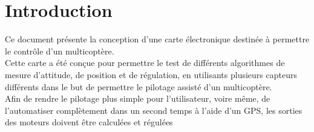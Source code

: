 
\chapter{Introduction} %

\label{Chapitre 1} %


Ce document présente la conception d'une carte électronique destinée à permettre le contrôle d'un multicoptère.
\\
Cette carte a été conçue pour permettre le test de différents algorithmes de mesure d'attitude, de position et de régulation, en utilisants plusieurs capteurs différents dans le but de permettre le pilotage assisté d'un multicoptère.
\\
Afin de rendre le pilotage plus simple pour l'utilisateur, voire même, de l'automatiser complètement dans un second temps à l'aide d'un GPS, les sorties des moteurs doivent être calculées et régulées 



















